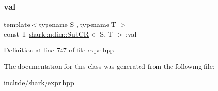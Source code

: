 \subsubsection{\texorpdfstring{val}{val}}
{\footnotesize\ttfamily template$<$typename S , typename T $>$ \\
const T \hyperlink{classshark_1_1ndim_1_1_sub_c_r}{shark\+::ndim\+::\+Sub\+CR}$<$ S, T $>$\+::val\hspace{0.3cm}{\ttfamily [private]}}



Definition at line 747 of file expr.\+hpp.



The documentation for this class was generated from the following file\+:\begin{DoxyCompactItemize}
\item 
include/shark/\hyperlink{expr_8hpp}{expr.\+hpp}\end{DoxyCompactItemize}
